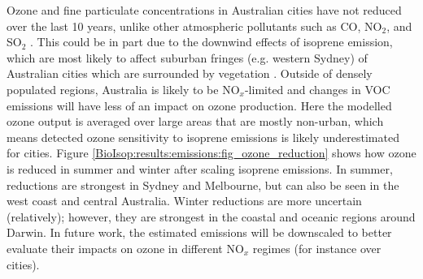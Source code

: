       Ozone and fine particulate concentrations in Australian cities have not reduced over the last 10 years, unlike other atmospheric pollutants such as CO, NO$_2$, and SO$_2$ \parencite{SOE2016}.
      This could be in part due to the downwind effects of isoprene emission, which are most likely to affect suburban fringes (e.g. western Sydney) of Australian cities which are surrounded by vegetation \parencite{Millet2016}.
      Outside of densely populated regions, Australia is likely to be NO$_x$-limited and changes in VOC emissions will have less of an impact on ozone production.
      Here the modelled ozone output is averaged over large areas that are mostly non-urban, which means detected ozone sensitivity to isoprene emissions is likely underestimated for cities.
      Figure \ref{BioIsop:results:emissions:fig_ozone_reduction} shows how ozone is reduced in summer and winter after scaling isoprene emissions.
      In summer, reductions are strongest in Sydney and Melbourne, but can also be seen in the west coast and central Australia.
      Winter reductions are more uncertain (relatively); however, they are strongest in the coastal and oceanic regions around Darwin.
      In future work, the estimated emissions will be downscaled to better evaluate their impacts on ozone in different NO$_x$ regimes (for instance over cities).
      
      
      
    
%      
%      

